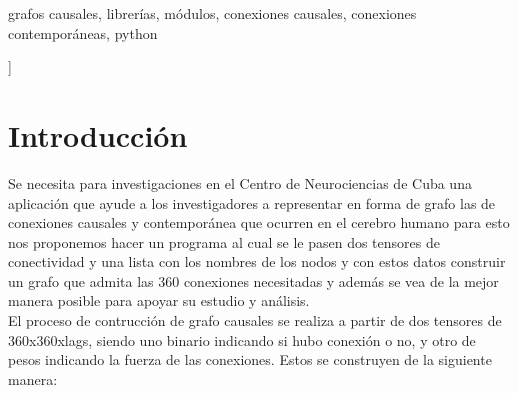 \documentclass[a4paper,10pt,twocolumn]{article}
\begin{document}
\begin{keywords}
	grafos causales,
	librerías,
	módulos,
	conexiones causales,
	conexiones contemporáneas,
	python
\end{keywords}



\vspace{1.8cm}
]



\section*{Introducción}\label{sec:intro}

Se necesita para investigaciones en el Centro de Neurociencias de Cuba una aplicación que ayude a los investigadores a representar en forma de grafo las de conexiones causales y contemporánea que ocurren en el cerebro humano para esto nos proponemos hacer un programa al cual se le pasen dos tensores de conectividad y una lista con los nombres de los nodos y con estos datos construir un grafo que admita las 360 conexiones necesitadas y además se vea de la mejor manera posible para apoyar su estudio y análisis.\\

El proceso de contrucción de grafo causales se realiza a partir de dos tensores de 360x360xlags, siendo uno binario indicando si hubo conexión o no, y otro de pesos indicando la fuerza de las conexiones. Estos se construyen de la siguiente manera:
\end{document}
